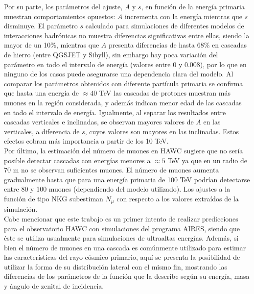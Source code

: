 Por su parte, los par\'ametros del ajuste, $A$ y $s$, en funci\'on de la energ\'ia primaria muestran comportamientos opuestos: $A$ incrementa con la energ\'ia mientras que $s$ disminuye. El par\'ametro $s$ calculado para simulaciones de diferentes modelos de interacciones hadr\'onicas no muestra diferencias significativas entre ellas, siendo la mayor de un 10\%, mientras que $A$ presenta diferencias de hasta 68\% en cascadas de hierro (entre QGSJET y Sibyll), sin embargo hay poca variaci\'on del par\'ametro en todo el intervalo de energ\'ia (valores entre 0 y 0.008), por lo que en ninguno de los casos puede asegurarse una dependencia clara del modelo. Al comparar los par\'ametros obtenidos con diferente part\'icula primaria se confirma que hasta una energ\'ia de $\approx 40$ TeV las cascadas de protones muestran m\'as muones en la regi\'on considerada, y adem\'as indican menor edad de las cascadas en todo el intervalo de energ\'ia. Igualmente, al separar los resultados entre cascadas verticales e inclinadas, se observan mayores valores de $A$ en las verticales, a diferencia de $s$, cuyos valores son mayores en las inclinadas. Estos efectos cobran m\'as importancia a partir de los 10 TeV. \\

Por \'ultimo, la estimaci\'on del n\'umero de muones en HAWC sugiere que no ser\'ia posible detectar cascadas con energ\'ias menores a $\approx 5$ TeV ya que en un radio de 70 m no se observan suficientes muones. El n\'umero de muones aumenta gradualmente hasta que para una energ\'ia primaria de 100 TeV podr\'ian detectarse entre 80 y 100 muones (dependiendo del modelo utilizado). Los ajustes a la funci\'on de tipo NKG subestiman $N_{\mu}$ \DIFaddbegin {}\DIFaddend con respecto a los valores extra\'idos de la simulaci\'on. \\

Cabe mencionar que este trabajo es un primer intento de realizar predicciones para el observatorio HAWC con simulaciones del programa AIRES, siendo que \'este se utiliza usualmente para simulaciones de ultraaltas energ\'ias. Adem\'as, si bien el n\'umero de muones en una cascada es com\'unmente utilizado para estimar las caracter\'isticas del rayo c\'osmico primario, aqu\'i se presenta la posibilidad de utilizar la forma de su distribuci\'on lateral con el mismo fin, mostrando las diferencias de los par\'ametros de la funci\'on que la describe seg\'un su energ\'ia, masa y \'angulo de zenital de incidencia\DIFaddbegin {}\DIFaddend .

